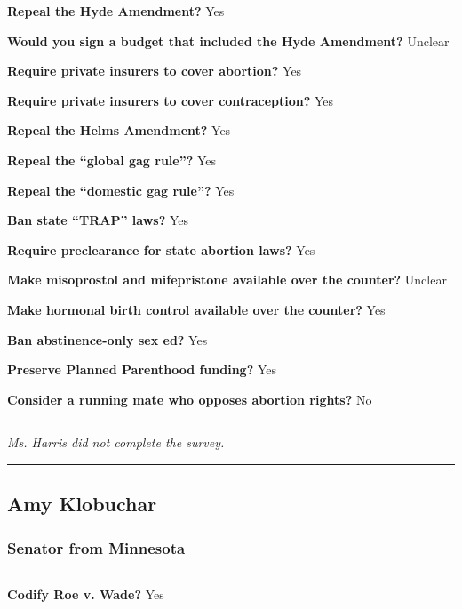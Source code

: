 \textbf{Repeal the Hyde Amendment?} Yes

\textbf{Would you sign a budget that included the Hyde Amendment?}
Unclear

\textbf{Require private insurers to cover abortion?} Yes

\textbf{Require private insurers to cover contraception?} Yes

\textbf{Repeal the Helms Amendment?} Yes

\textbf{Repeal the ``global gag rule''?} Yes

\textbf{Repeal the ``domestic gag rule''?} Yes

\textbf{Ban state ``TRAP'' laws?} Yes

\textbf{Require preclearance for state abortion laws?} Yes

\textbf{Make misoprostol and mifepristone available over the counter?}
Unclear

\textbf{Make hormonal birth control available over the counter?} Yes

\textbf{Ban abstinence-only sex ed?} Yes

\textbf{Preserve Planned Parenthood funding?} Yes

\textbf{Consider a running mate who opposes abortion rights?} No

\begin{center}\rule{0.5\linewidth}{\linethickness}\end{center}

\emph{Ms. Harris did not complete the survey.}

\begin{center}\rule{0.5\linewidth}{\linethickness}\end{center}

\hypertarget{amy-klobuchar}{%
\subsection{Amy Klobuchar}\label{amy-klobuchar}}

\hypertarget{senator-from-minnesota}{%
\subsubsection{Senator from Minnesota}\label{senator-from-minnesota}}

\begin{center}\rule{0.5\linewidth}{\linethickness}\end{center}

\textbf{Codify Roe v. Wade?} Yes

